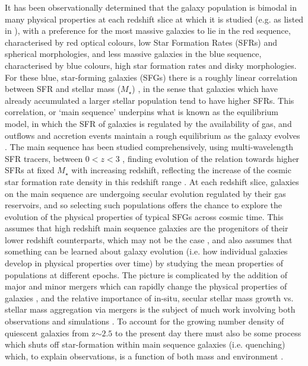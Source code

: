 \documentclass[fleqn,usenatbib]{mn2e}
\begin{document}
It has been observationally determined that the galaxy population is bimodal in many physical properties at each redshift slice at which it is studied (e.g. as listed in \cite{Dekel2006}), with a preference for the most massive galaxies to lie in the red sequence, characterised by red optical colours, low Star Formation Rates (SFRs) and spherical morphologies, and less massive galaxies in the blue sequence, characterised by blue colours, high star formation rates and disky morphologies. 
For these blue, star-forming galaxies (SFGs) there is a roughly linear correlation between SFR and stellar mass ($M_{\star}$) \citep[e.g.][]{Daddi2007,Noeske2007,Elbaz2007}, in the sense that galaxies which have already accumulated a larger stellar population tend to have higher SFRs.
This correlation, or `main sequence' underpins what is known as the equilibrium model, in which the SFR of galaxies is regulated by the availability of gas, and outflows and accretion events maintain a rough equilibrium as the galaxy evolves \citep[e.g.][]{Dave2012,Lilly2013,Saintonge2013}.
The main sequence has been studied comprehensively, using multi-wavelength SFR tracers, between $0 < z < 3$ \citep[e.g.][]{Rodighiero2011,Karim2011,Whitaker2012,Behroozi2013b,Whitaker2014,Rodighiero2014,Speagle2014,Pannella2014,Sparre2015,Lee2015,Nelson2016}, finding evolution of the relation towards higher SFRs at fixed $M_{\star}$ with increasing redshift, reflecting the increase of the cosmic star formation rate density in this redshift range \citep{Madau_2014}.
At each redshift slice, galaxies on the main sequence are undergoing secular evolution regulated by their gas reservoirs, and so selecting such populations offers the chance to explore the evolution of the physical properties of typical SFGs across cosmic time.
This assumes that high redshift main sequence galaxies are the progenitors of their lower redshift counterparts, which may not be the case \citep[e.g.][]{Gladders2013,Kelson2014,Abramson2016b}, and also assumes that something can be learned about galaxy evolution (i.e. how individual galaxies develop in physical properties over time) by studying the mean properties of populations at different epochs.
The picture is complicated by the addition of major and minor mergers which can rapidly change the physical properties of galaxies \citep[e.g.][]{Toomre1977,Lotz2008,Conselice2011,Conselice2014}, and the relative importance of in-situ, secular stellar mass growth vs. stellar mass aggregation via mergers is the subject of much work involving both observations and simulations \citep[e.g.][]{Robaina2009,Kaviraj2012,Stott2013,Lofthouse2016,Qu2016}. 
To account for the growing number density of quiescent galaxies from z$\sim 2.5$ to the present day \citep[e.g.][]{Bell2004,Faber2007,Brown2007,Ilbert2010,Brammer2011,Muzzin2013,Buitrago2013} there must also be some process which shuts off star-formation within main sequence galaxies (i.e. quenching) which, to explain observations, is a function of both mass and environment \citep{Peng2010}.
\end{document}
